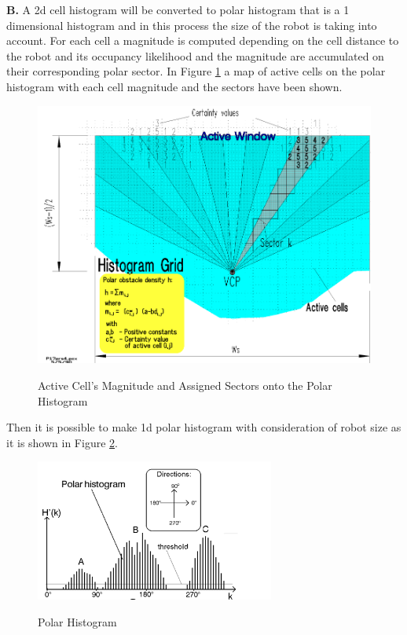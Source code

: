 \noindent \textbf{ B. } A 2d cell histogram will be converted to polar histogram that is a 1 dimensional histogram and in this process the size of the robot is taking into account.
For each cell a magnitude is computed depending on the cell distance to the robot and its occupancy likelihood and the magnitude are accumulated on their corresponding polar sector. In Figure \ref{fig:Active Cell's Magnitude and Assigned Sectors onto the Polar Histogram} a map of active cells on the polar histogram with each cell magnitude and the sectors have been shown. 
\begin{figure}[H]
  \centering
  \includegraphics[width= 1.0\textwidth]{Figures/Active cells.PNG}
  \caption[Active Cell's Magnitude and Assigned Sectors onto the Polar Histogram]{Active Cell's Magnitude and Assigned Sectors onto the Polar Histogram}
   \label{fig:Active Cell's Magnitude and Assigned Sectors onto the Polar Histogram} \cite{Borenstein1991}
\end{figure}
\noindent Then it is possible to make 1d polar histogram with consideration of robot size as it is shown in Figure \ref{fig:Polar Histogram}. 
\begin{figure}[H]
  \centering
  \includegraphics[width= 0.7\textwidth]{Figures/Polar Histogram.PNG}
  \caption[Polar Histogram]{Polar Histogram}
   \label{fig:Polar Histogram} \cite{Borenstein1991}
\end{figure}
